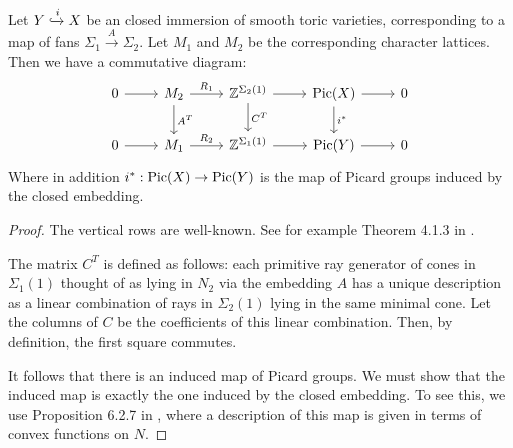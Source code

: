 \begin{lemma}
\label{lemma:induced}
Let $Y \xhookrightarrow{i} X$ be an closed immersion of smooth toric varieties, corresponding to a map of fans $\Sigma_1 \xrightarrow{A} \Sigma_2$. Let $M_1$ and $M_2$ be the corresponding character lattices. Then we have a commutative diagram:
\[
\begin{tikzcd}
0 \arrow{r} &  M_2 \arrow{r}{R_1} \arrow{d}{A^T} & \Z^{\Sigma_2(1)} \arrow{d}{C^T} \arrow{r} & \Pic(X)  \arrow{d}{i^\ast} \arrow{r} & 0\\
0 \arrow{r} &  M_1 \arrow{r}{R_2} & \Z^{\Sigma_1(1)} \arrow{r} & \Pic(Y) \arrow{r} & 0
\end{tikzcd}
\]
Where in addition $i^\ast : \operatorname{Pic}(X) \to \operatorname{Pic}(Y)$ is the map of Picard groups induced by the closed embedding.
\end{lemma}
\begin{proof}
The vertical rows are well-known. See for example Theorem 4.1.3 in \cite{cox_toric}.

The matrix $C^T$ is defined as follows: each primitive ray generator of cones in $\Sigma_1(1)$ thought of as lying in $N_2$ via the embedding $A$ has a unique description as a linear combination of rays in $\Sigma_2(1)$ lying in the same minimal cone. Let the columns of $C$ be the coefficients of this linear combination. Then, by definition, the first square commutes.

It follows that there is an induced map of Picard groups. We must show that the induced map is exactly the one induced by the closed embedding. To see this, we use Proposition 6.2.7 in \cite{cox_toric}, where a description of this map is given in terms of convex functions on $N$.

\end{proof}

